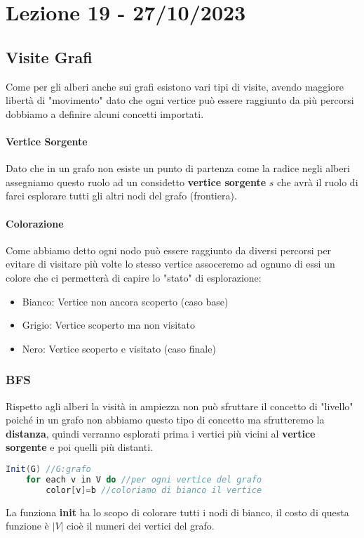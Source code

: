 \section{Lezione 19 - 27/10/2023}
\subsection{Visite Grafi}
Come per gli alberi anche sui grafi esistono vari tipi di visite, avendo maggiore libertà di "movimento" dato che ogni vertice può essere raggiunto da più percorsi dobbiamo a definire alcuni concetti importati.

\paragraph{Vertice Sorgente}
Dato che in un grafo non esiste un punto di partenza come la radice negli alberi assegniamo questo ruolo ad un considetto \textbf{vertice sorgente} $s$ che avrà il ruolo di farci esplorare tutti gli altri nodi del grafo (frontiera).

\paragraph{Colorazione}
Come abbiamo detto ogni nodo può essere raggiunto da diversi percorsi per evitare di visitare più volte lo stesso vertice assoceremo ad ognuno di essi un colore che ci permetterà di capire lo "stato" di esplorazione:
\begin{itemize}
    \item Bianco: Vertice non ancora scoperto (caso base)
    \item Grigio: Vertice scoperto ma non visitato
    \item Nero: Vertice scoperto e visitato (caso finale)
\end{itemize}

\subsubsection{BFS}
Rispetto agli alberi la visità in ampiezza non può sfruttare il concetto di "livello" poiché in un grafo non abbiamo questo tipo di concetto ma sfrutteremo la \textbf{distanza}, quindi verranno esplorati prima i vertici più vicini al \textbf{vertice sorgente} e poi quelli più distanti.

\begin{lstlisting}[language=Java]
Init(G) //G:grafo
    for each v in V do //per ogni vertice del grafo
        color[v]=b //coloriamo di bianco il vertice
\end{lstlisting}
La funziona \textbf{init} ha lo scopo di colorare tutti i nodi di bianco, il costo di questa funzione è $|V|$ cioè il numeri dei vertici del grafo.

